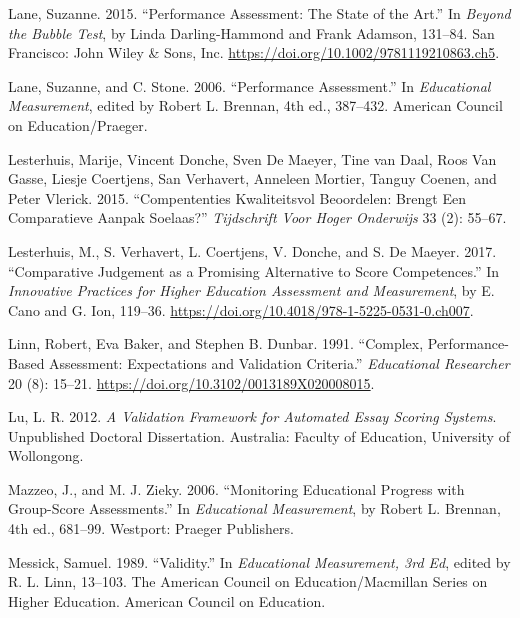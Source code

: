 \documentclass[
  letterpaper,
]{report}
\newlength{\cslhangindent}
\newlength{\cslentryspacingunit} %
\newenvironment{CSLReferences}[2] %
 {%
  \setlength{\parindent}{0pt}
  \ifodd #1
  \let\oldpar\par
  \def\par{\hangindent=\cslhangindent\oldpar}
  \fi
  \setlength{\parskip}{#2\cslentryspacingunit}
 }%
 {}
\begin{document}
\begin{CSLReferences}{1}{0}
\leavevmode{}%
Lane, Suzanne. 2015. {``Performance {Assessment}: {The State} of the
{Art}.''} In \emph{Beyond the {Bubble Test}}, by Linda Darling-Hammond
and Frank Adamson, 131--84. {San Francisco}: {John Wiley \& Sons, Inc.}
\url{https://doi.org/10.1002/9781119210863.ch5}.

\leavevmode{}%
Lane, Suzanne, and C. Stone. 2006. {``Performance {Assessment}.''} In
\emph{Educational {Measurement}}, edited by Robert L. Brennan, 4th ed.,
387--432. {American Council on Education/Praeger}.

\leavevmode{}%
Lesterhuis, Marije, Vincent Donche, Sven De Maeyer, Tine van Daal, Roos
Van Gasse, Liesje Coertjens, San Verhavert, Anneleen Mortier, Tanguy
Coenen, and Peter Vlerick. 2015. {``Compententies Kwaliteitsvol
Beoordelen: Brengt Een Comparatieve Aanpak Soelaas?''} \emph{Tijdschrift
Voor Hoger Onderwijs} 33 (2): 55--67.

\leavevmode{}%
Lesterhuis, M., S. Verhavert, L. Coertjens, V. Donche, and S. De Maeyer.
2017. {``Comparative Judgement as a Promising Alternative to Score
Competences.''} In \emph{Innovative {Practices} for {Higher Education
Assessment} and {Measurement}}, by E. Cano and G. Ion, 119--36.
\url{https://doi.org/10.4018/978-1-5225-0531-0.ch007}.

\leavevmode{}%
Linn, Robert, Eva Baker, and Stephen B. Dunbar. 1991. {``Complex,
{Performance-Based Assessment}: {Expectations} and {Validation
Criteria}.''} \emph{Educational Researcher} 20 (8): 15--21.
\url{https://doi.org/10.3102/0013189X020008015}.

\leavevmode{}%
Lu, L. R. 2012. \emph{A Validation Framework for Automated Essay Scoring
Systems}. Unpublished Doctoral Dissertation. {Australia}: {Faculty of
Education, University of Wollongong}.

\leavevmode{}%
Mazzeo, J., and M. J. Zieky. 2006. {``Monitoring {Educational Progress}
with {Group-Score Assessments}.''} In \emph{Educational {Measurement}},
by Robert L. Brennan, 4th ed., 681--99. {Westport}: {Praeger
Publishers}.

\leavevmode{}%
Messick, Samuel. 1989. {``Validity.''} In \emph{Educational Measurement,
3rd Ed}, edited by R. L. Linn, 13--103. The {American Council} on
{Education}/{Macmillan} Series on Higher Education. {American Council on
Education}.


\end{CSLReferences}
\end{document}
